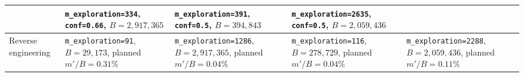 \begin{table}[ht]
\begin{tabular}{lllll}
& \makecell{\texttt{m\_exploration=334}, \\ \texttt{conf=0.66}, \\ {\scriptsize $B=2{,}917{,}365$}}
& \makecell{\texttt{m\_exploration=391}, \\ \texttt{conf=0.5}, \\ {\scriptsize $B=394{,}843$}}
& \makecell{\texttt{m\_exploration=2635}, \\ \texttt{conf=0.5}, \\ {\scriptsize $B=2{,}059{,}436$}} \\
\midrule
Reverse engineering
& \makecell{\texttt{m\_exploration=91}, \\ {\scriptsize $B=29{,}173$}, \\ {\scriptsize planned $m'/B=0.31\%$}}
& \makecell{\texttt{m\_exploration=1286}, \\ {\scriptsize $B=2{,}917{,}365$}, \\ {\scriptsize planned $m'/B=0.04\%$}}
& \makecell{\texttt{m\_exploration=116}, \\ {\scriptsize $B=278{,}729$}, \\ {\scriptsize planned $m'/B=0.04\%$}}
& \makecell{\texttt{m\_exploration=2288}, \\ {\scriptsize $B=2{,}059{,}436$}, \\ {\scriptsize planned $m'/B=0.11\%$}} \\
\bottomrule
\end{tabular}
\end{table}
